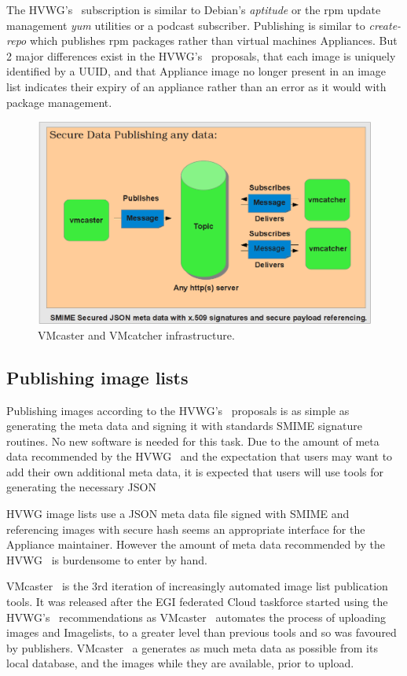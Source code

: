 \documentclass{llncs_Ibergrid2013}
\begin{document}
The HVWG's~\cite{hepix} subscription is similar to Debian's \textit{aptitude} or the rpm update management \textit{yum} utilities or a podcast subscriber. Publishing is similar to \textit{create-repo} which publishes rpm packages rather than virtual machines Appliances. But 2 major differences exist in the HVWG's~\cite{hepix} proposals, that each image is uniquely identified by a UUID, and that Appliance image no longer present in an image list indicates their expiry of an appliance rather than an error as it would with package management.
\begin{figure}[h]
\centering
\includegraphics[width=1\textwidth]{vmcaster_vmcatcher.png}
\caption{VMcaster and VMcatcher infrastructure.}
\label{fig:infrastructure}
\end{figure}

\subsection{Publishing image lists}
Publishing images according to the HVWG's~\cite{hepix} proposals is as simple as generating the meta data and signing it with standards SMIME signature routines. No new software is needed for this task. Due to the amount of meta data recommended by the HVWG~\cite{hepix} and the expectation that users may want to add their own additional meta data, it is expected that users will use tools for generating the necessary JSON 

HVWG image lists use a JSON meta data file signed with SMIME and referencing images with secure hash seems an appropriate interface for the Appliance maintainer. However the amount of meta data recommended by the HVWG~\cite{hepix} is burdensome to enter by hand.
 
VMcaster~\cite{vmcaster} is the 3rd iteration of increasingly automated image list publication tools. It was released after the EGI federated Cloud taskforce started using the HVWG's~\cite{hepix} recommendations as VMcaster~\cite{vmcaster} automates the process of uploading images and Imagelists, to a greater level than previous tools and so was favoured by publishers. VMcaster~\cite{vmcaster} a generates as much meta data as possible from its local database, and the images while they are available, prior to upload.
\end{document}
